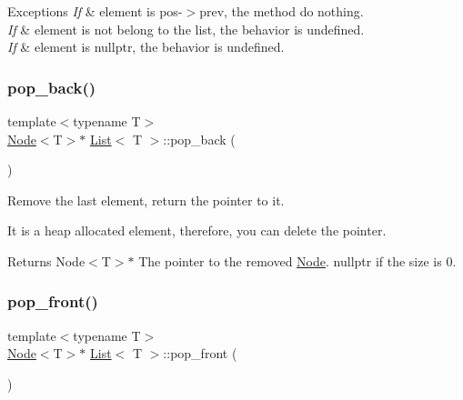 \begin{DoxyExceptions}{Exceptions}
{\em If} & element is pos-\/$>$prev, the method do nothing. \\
\hline
{\em If} & element is not belong to the list, the behavior is undefined. \\
\hline
{\em If} & element is nullptr, the behavior is undefined. \\
\hline
\end{DoxyExceptions}
\mbox{\label{class_list_aca64c15e326dd7515499310bc9f2efb0}} 
\subsubsection{\texorpdfstring{pop\+\_\+back()}{pop\_back()}}
{\footnotesize\ttfamily template$<$typename T$>$ \\
\hyperlink{struct_node}{Node}$<$T$>$$\ast$ \hyperlink{class_list}{List}$<$ T $>$\+::pop\+\_\+back (\begin{DoxyParamCaption}{ }\end{DoxyParamCaption})\hspace{0.3cm}{\ttfamily [inline]}}



Remove the last element, return the pointer to it. 

It is a heap allocated element, therefore, you can delete the pointer.

\begin{DoxyReturn}{Returns}
Node$<$\+T$>$$\ast$ The pointer to the removed \hyperlink{struct_node}{Node}. {\ttfamily nullptr} if the size is 0. 
\end{DoxyReturn}
\mbox{\label{class_list_a3188f038a0b9c0a578bccdf7348f42b5}} 
\subsubsection{\texorpdfstring{pop\+\_\+front()}{pop\_front()}}
{\footnotesize\ttfamily template$<$typename T$>$ \\
\hyperlink{struct_node}{Node}$<$T$>$$\ast$ \hyperlink{class_list}{List}$<$ T $>$\+::pop\+\_\+front (\begin{DoxyParamCaption}{ }\end{DoxyParamCaption})\hspace{0.3cm}{\ttfamily [inline]}}



